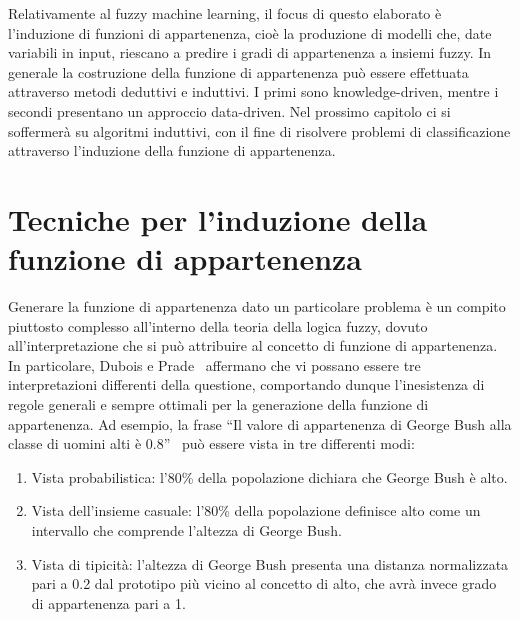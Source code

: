 \documentclass[11pt,  oneside, openany]{book}
\begin{document}
Relativamente al fuzzy machine learning, il focus di questo elaborato è l'induzione di funzioni di appartenenza, cioè la produzione di modelli che, date variabili in input, riescano a predire i gradi di appartenenza a insiemi fuzzy. In generale la costruzione della funzione di appartenenza può essere effettuata attraverso metodi deduttivi e induttivi. I primi sono knowledge-driven, mentre i secondi presentano un approccio data-driven. Nel prossimo capitolo ci si soffermerà su algoritmi induttivi, con il fine di risolvere problemi di classificazione attraverso l'induzione della funzione di appartenenza. 


	\newpage
	\chapter{Tecniche per l'induzione della funzione di appartenenza}

Generare la funzione di appartenenza dato un particolare problema è un compito piuttosto complesso all'interno della teoria della logica fuzzy, dovuto all'interpretazione che si può attribuire al concetto di funzione di appartenenza. In particolare, Dubois e Prade~\cite{membinterp} affermano che vi possano essere tre interpretazioni differenti della questione, comportando dunque l'inesistenza di regole generali e sempre ottimali per la generazione della funzione di appartenenza. Ad esempio, la frase ``Il valore di appartenenza di George Bush alla classe di uomini alti è 0.8''~\cite{membpaper} può essere vista in tre differenti modi:

\begin{enumerate}
\item Vista probabilistica: l'80\% della popolazione dichiara che George Bush è alto.
\item Vista dell'insieme casuale: l'80\% della popolazione definisce alto come un intervallo che comprende l'altezza di George Bush.
\item Vista di tipicità: l'altezza di George Bush presenta una distanza normalizzata pari a 0.2 dal prototipo più vicino al concetto di alto, che avrà invece grado di appartenenza pari a 1. 
\end{enumerate}
\end{document}
